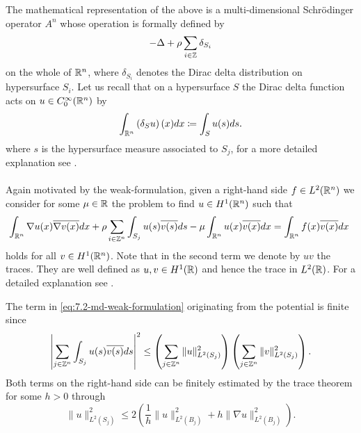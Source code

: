 The mathematical representation of the above is a multi-dimensional Schrödinger operator $A^{n}$ whose operation is formally defined by
\begin{equation}
	- \Delta + \rho \sum_{i \in \mathbb{Z}} \delta_{S_{i}} \label{eq:7.1-md_the_operator_A_formallyy}
\end{equation}
on the whole of $\mathbb{R}^{n}$, where $\delta_{S_{i}}$ denotes the Dirac delta distribution on hypersurface $S_{i}$. Let us recall that on a hypersurface $S$ the Dirac delta function acts on $u \in C_{0}^{\infty}(\mathbb{R}^{n})$ by 
	\[ \int_{\mathbb{R}^{n}} \left( \delta_{S} u \right) (x) dx \coloneqq \int_{S} u(s) ds . \]
where $s$ is the hypersurface measure associated to $S_{j}$, for a more detailed explanation see \cite{federer1978geomeasure}.
~\\ ~\\ %
Again motivated by the weak-formulation, given a right-hand side $f \in L^{2}(\mathbb{R}^{n})$ we consider for some $\mu \in \mathbb{R}$ the problem to find $u \in H^{1}(\mathbb{R}^{n})$ such that
	\begin{equation}
		\int_{\R^{n}} \nabla u(x) \overline{\nabla v(x)} dx + \rho \sum_{i \in \Z^{n}} \int_{S_{j}} u(s) \overline{v(s)} ds - \mu \int_{\R^{n}} u(x) \overline{v(x)} dx = \int_{\R^{n}} f(x) \overline{v(x)} dx \label{eq:7.2-md-weak-formulation}
	\end{equation} 
holds for all $v \in H^{1}(\mathbb{R}^{n})$. Note that in the second term we denote by $u v$ the traces. They are well defined as $u, v \in H^{1}(\mathbb{R})$ and hence the trace in $L^{2}(\mathbb{R})$. For a detailed explanation see \cite[page 164]{adams2003sobolev}.  

\begin{remark}
	The term in \eqref{eq:7.2-md-weak-formulation} originating from the potential is finite since
	\[ \left| \sum_{j \in \mathbb{Z}^{n}} \int_{S_{j}} u(s) \overline{v(s)} ds \right|^{2} \leq \left( \sum_{j \in \mathbb{Z}^{n}} \| u \|_{L^{2}(S_{j})}^{2} \right) \left( \sum_{j \in \mathbb{Z}^{n}} \| v \|_{L^{2}(S_{j})}^{2} \right). \] %
	Both terms on the right-hand side can be finitely estimated by the trace theorem \cite[page 258]{evans1998partial} for some $h > 0$ through
	\[ \| u \|_{L^{2}(S_{j})}^{2} \leq 2 \left( \frac{1}{h} \|u\|_{L^{2}(B_{j})}^{2} + h \| \nabla u \|_{L^{2}(B_{j})}^{2} \right). \] %
\end{remark}

